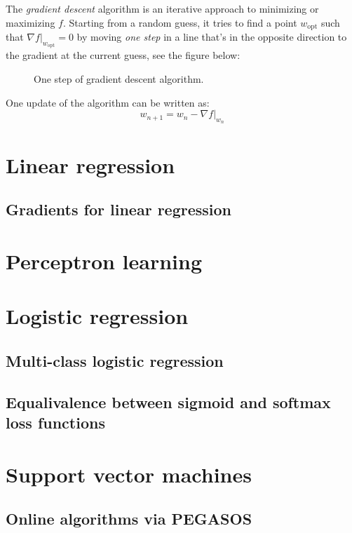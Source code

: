 \documentclass[12pt]{article}
\begin{document}
The \textit{gradient descent} algorithm is an iterative approach to
minimizing or maximizing $f$. Starting from a random guess, it tries
to find a point $w_{\text{opt}}$ such that
$\nabla{f}|_{w_{\text{opt}}} = 0$ by moving \textit{one step} in a
line that's in the opposite direction to the gradient at the current
guess, see the figure below:

\begin{figure}[htbp]
  \begin{center}
    
  \end{center}
  \caption{One step of gradient descent algorithm.}
\end{figure}

One update of the algorithm can be written as:
\[
w_{n+1} = w_{n} - \left.\nabla{f}\right|_{w_n}
\]

\section{Linear regression}
\subsection{Gradients for linear regression}

\section{Perceptron learning}

\section{Logistic regression}

\subsection{Multi-class logistic regression}

\subsection{Equalivalence between sigmoid and softmax loss functions}

\section{Support vector machines}
\subsection{Online algorithms via PEGASOS}
\end{document}
